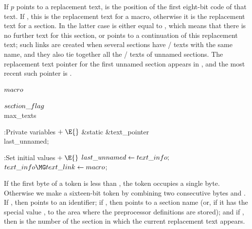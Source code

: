 If $p$ points to a replacement text,  is the  position
of the first eight-bit code of that text. If ,
this is the replacement text for a macro, otherwise it is the replacement
text for a section. In the latter case  is either
equal to
, which means that there is no further text for this
section, or
 points to a continuation of this replacement text;
such
links are created when several sections have \CEE/ texts with the same
name, and they also tie together all the \CEE/ texts of unnamed sections.
The replacement text pointer for the first unnamed section appears in
, and the most recent such pointer is %
.

\Y\B\4\D$\\{macro}$ \5
\par
\B\4\D$\\{section\_flag}$ \5
\\{max\_texts}\par
\Y\B\4:Private variables\X${}\mathrel+\E{}$\6
\&{static} \&{text\_pointer} \\{last\_unnamed};\par
\fi

\B{}:Set initial values\X${}\mathrel+\E{}$\6
$\\{last\_unnamed}\leftarrow\\{text\_info};{}$\6
${}\\{text\_info}\MG\\{text\_link}\K\\{macro}{}$;\par
\fi

If the first byte of a token is less than , the token
occupies a
single byte. Otherwise we make a sixteen-bit token by combining two consecutive
bytes  and . If , then 
points to an identifier; if , then
 points to a section name
(or, if it has the special value ,
to the area where the preprocessor definitions are stored); and if
, then  is the number of the section
in which the current replacement text appears.

